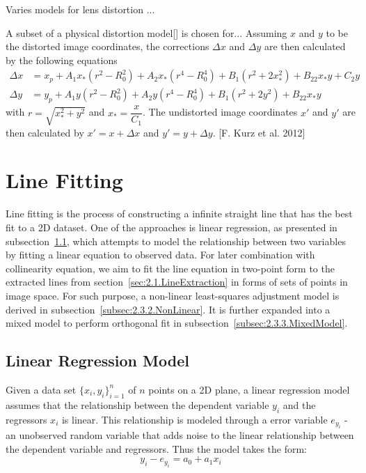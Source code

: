Varies models for lens distortion ...

A subset of a physical distortion model[] is chosen for...
Assuming $x$ and $y$ to be the distorted image coordinates, the corrections $\Delta x$ and $\Delta y$ are then calculated by the following equations
\begin{equation} %
\begin{split}
\Delta x &= x_p + A_1x_*(r^2-R_0^2) + A_2x_*(r^4-R_0^4) + B_1(r^2+2x_*^2) + B_22x_*y+C_2y \\
\Delta y &= y_p + A_1y  (r^2-R_0^2) + A_2y  (r^4-R_0^4) + B_1(r^2+2y^2)   + B_22x_*y
\end{split}
\end{equation}
with $r=\sqrt{x_*^2+y^2}$ and $x_*=\dfrac{x}{C_1}$. The undistorted image coordinates $x\prime$ and $y\prime$ are then calculated by $x\prime=x+\Delta x$ and $y\prime=y+\Delta y$. [F. Kurz et al. 2012] 



\section{Line Fitting}
\label{sec:2.3.LineFitting}

Line fitting is the process of constructing a infinite straight line that has the best fit to a 2D dataset. One of the approaches is linear regression, as presented in subsection~\ref{subsec:2.3.1.LinearRegression}, which attempts to model the relationship between two variables by fitting a linear equation to observed data. For later combination with collinearity equation, we aim to fit the line equation in two-point form to the extracted lines from section~\ref{sec:2.1.LineExtraction} in forms of sets of points in image space. %
For such purpose, a non-linear least-squares adjustment model is derived in subsection~\ref{subsec:2.3.2.NonLinear}. It is further expanded into a mixed model to perform orthogonal fit in subsection~\ref{subsec:2.3.3.MixedModel}.

\subsection{Linear Regression Model}
\label{subsec:2.3.1.LinearRegression}
Given a data set $\{x_i,y_i\}^n_{i=1}$ of $n$ points on a 2D plane, a linear regression model assumes that the relationship between the dependent variable $y_i$ and the regressors $x_i$ is linear. This relationship is modeled through a error variable $e_{y_i}$ -an unobserved random variable that adds noise to the linear relationship between the dependent variable and regressors.
Thus the model takes the form:
\begin{equation} %
y_i - e_{y_i} = a_0 + a_1x_i
\end{equation}

